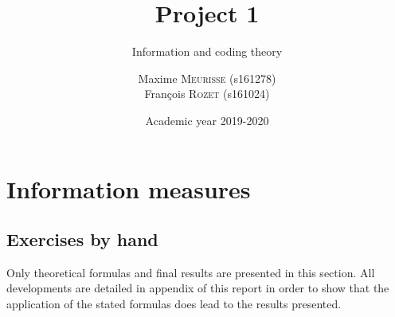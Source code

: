 \documentclass[a4paper, 12pt]{article}
\institute{University of Liège}
\title{Project 1}
\subtitle{Information and coding theory}
\author{
    Maxime \textsc{Meurisse} (s161278)\\
    François \textsc{Rozet} (s161024)\\
}
\date{Academic year 2019-2020}
\begin{document}
    \maketitle
    
    \section*{Information measures}

    \subsection*{Exercises by hand}
    
    \begin{rmk}
        Only theoretical formulas and final results are presented in this section. All developments are detailed in appendix of this report in order to show that the application of the stated formulas does lead to the results presented.
    \end{rmk}
\end{document}
